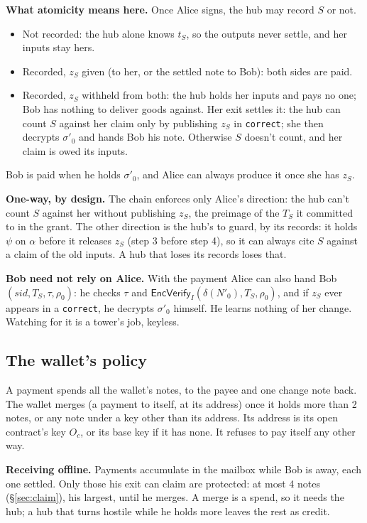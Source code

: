 \documentclass[11pt]{article}
\theoremstyle{plain}
\theoremstyle{definition}
\newcommand{\tx}[1]{\texttt{#1}}
\newcommand{\sid}{\mathit{sid}}
\newcommand{\Oc}{O_c}
\newcommand{\EVfy}{\mathsf{EncVerify}}
\begin{document}
\textbf{What atomicity means here.} Once Alice signs, the hub may record
$S$ or not.
\begin{itemize}[nosep]
\item Not recorded: the hub alone knows $t_S$, so the outputs never
  settle, and her inputs stay hers.
\item Recorded, $z_S$ given (to her, or the settled note to Bob): both
  sides are paid.
\item Recorded, $z_S$ withheld from both: the hub holds her inputs and
  pays no one; Bob has nothing to deliver goods against. Her exit
  settles it: the hub can count $S$ against her claim only by publishing
  $z_S$ in \tx{correct}; she then decrypts $\sigma'_0$ and hands Bob
  his note. Otherwise $S$ doesn't count, and her claim is owed its
  inputs.
\end{itemize}
Bob is paid when he holds $\sigma'_0$, and Alice can always produce it
once she has $z_S$.

\textbf{One-way, by design.} The chain enforces only Alice's direction:
the hub can't count $S$ against her without publishing $z_S$, the
preimage of the $T_S$ it committed to in the grant. The other direction
is the hub's to guard, by its records: it holds $\psi$ on $\alpha$
before it releases $z_S$ (step 3 before step 4), so it can always cite
$S$ against a claim of the old inputs. A hub that loses its records
loses that.

\textbf{Bob need not rely on Alice.} With the payment Alice can also
hand Bob $(\sid, T_S, \tau, \rho_0)$: he checks $\tau$ and
$\EVfy_I(\delta(N'_0), T_S, \rho_0)$, and if $z_S$ ever appears in a
\tx{correct}, he decrypts $\sigma'_0$ himself. He learns nothing of her
change. Watching for it is a tower's job, keyless.

\subsection{The wallet's policy}\label{sec:wallet}

A payment spends all the wallet's notes, to the payee and one change
note back. The wallet merges (a payment to itself, at its address) once
it holds more than 2 notes, or any note under a key other than its
address. Its address is its open contract's key $\Oc$, or its base key
if it has none. It refuses to pay itself any other way.

\textbf{Receiving offline.} Payments accumulate in the mailbox while
Bob is away, each one settled. Only those his exit can claim are
protected: at most 4 notes (\S\ref{sec:claim}), his largest, until he
merges. A merge is a spend, so it needs the hub; a hub that turns
hostile while he holds more leaves the rest as credit.
\end{document}
